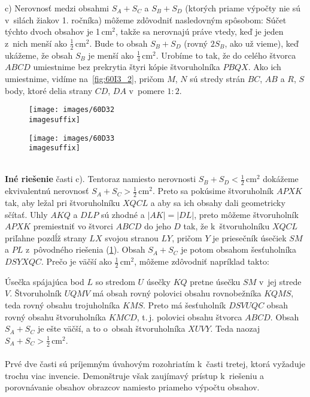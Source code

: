 {c) Nerovnosť medzi obsahmi $S_A + S_C$ a $S_B + S_D$ (ktorých priame výpočty nie sú v~silách žiakov 1. ročníka) môžeme zdôvodniť nasledovným spôsobom: Súčet týchto dvoch obsahov je 1\,cm$^2$, takže sa nerovnajú práve vtedy, keď je jeden z~nich menší ako $\frac{1}{2}$\,cm$^2$. Bude to obsah $S_B +S_D$ (rovný $2S_B$, ako už vieme), keď ukážeme, že obsah $S_B$ je menší ako $\frac{1}{4}$\,cm$^2$. Urobíme to tak, že do celého štvorca $ABCD$ umiestnime bez prekrytia štyri kópie štvoruholníka $PBQX$. Ako ich umiestnime, vidíme na~\ref{fig:60I3_2}, pričom $M$, $N$ sú stredy strán $BC$, $AB$ a $R$, $S$ body, ktoré delia strany $CD$, $DA$ v~pomere $1 : 2$.
\begin{figure}[h]
    \centering
    \begin{minipage}{0.45\textwidth}
        \centering
        \texttt{[image: images/60D32\\imagesuffix]}
        \caption{}
        \label{fig:60I3_2}
    \end{minipage}\hfill
    \begin{minipage}{0.45\textwidth}
        \centering
        \texttt{[image: images/60D33\\imagesuffix]}
        \caption{}
        \label{fig:60I3_3}
    \end{minipage}
\end{figure}
\\
\textbf{Iné riešenie} časti c). Tentoraz namiesto nerovnosti $S_B + S_ D < \frac{1}{2}$\,cm$^2$ dokážeme ekvivalentnú nerovnosť $S_A +S_C >\frac{1}{2}$\,cm$^2$. Preto sa pokúsime  štvoruholník $APXK$ tak, aby ležal pri štvoruholníku $XQCL$ a aby sa ich obsahy dali geometricky sčítať. Uhly $AKQ$ a $DLP$ sú zhodné a $| AK | = | DL |$, preto môžeme štvoruholník $APXK$ premiestniť vo štvorci $ABCD$ do jeho  $D$ tak, že k~štvoruholníku $XQCL$ priľahne pozdĺž strany $LX$ svojou stranou $LY$, pričom $Y$ je priesečník úsečiek $SM$ a $PL$ z~pôvodného riešenia (\ref{fig:60I3_3}). Obsah $S_A + S_C$ je potom obsahom šesťuholníka $DSYXQC$. Prečo je väčší ako $\frac{1}{2}$\,cm$^2$, môžeme zdôvodniť napríklad takto:

Úsečka spájajúca bod $L$ so stredom $U$ úsečky $KQ$ pretne úsečku $SM$ v~jej strede $V$. Štvoruholník $UQMV$ má obsah rovný polovici obsahu rovnobežníka $KQMS$, teda rovný obsahu trojuholníka $KMS$. Preto má šesťuholník $DSV UQC$ obsah rovný obsahu štvoruholníka $KMCD$,  t.\,j. polovici obsahu štvorca $ABCD$. Obsah $S_A +S_C$ je ešte väčší, a to o~obsah štvoruholníka $XUVY$. Teda naozaj $S_A + S_C >\frac{1}{2}$\,cm$^2$.\\
\\
\kom Prvé dve časti sú príjemným úvahovým rozohriatím k~časti tretej, ktorá vyžaduje trochu viac invencie. Demonštruje však zaujímavý prístup k~riešeniu a porovnávanie obsahov obrazcov namiesto priameho výpočtu obsahov.\\
}